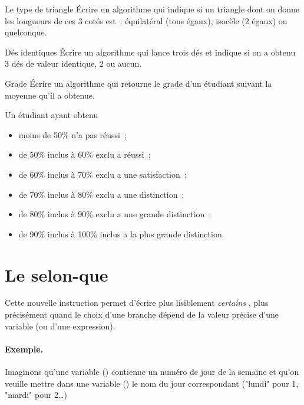 	\begin{Exercice}{Le type de triangle}
		Écrire un algorithme qui indique si un triangle
		dont on donne les longueurs de ces 3 cotés est~:
		équilatéral (tous égaux), isocèle (2 égaux)
		ou quelconque.
	\end{Exercice}

	\begin{Exercice}{Dés identiques}
		Écrire un algorithme qui lance trois dés
		et indique si on a obtenu 3 dés de valeur identique,
		2 ou aucun.
	\end{Exercice}

	\begin{Exercice}{Grade}
		Écrire un algorithme qui retourne le grade d’un étudiant 
		suivant la moyenne qu’il a obtenue.
		
		Un étudiant ayant obtenu 
		\begin{itemize}
			\item moins de 50\% n’a pas réussi~;
			\item de 50\% inclus à 60\% exclu a réussi~;
			\item de 60\% inclus à 70\% exclu a une satisfaction~;
			\item de 70\% inclus à 80\% exclu a une distinction~;
			\item de 80\% inclus à 90\% exclu a une grande distinction~;
			\item de 90\% inclus à 100\% inclus a la plus grande distinction.
		\end{itemize}
	\end{Exercice}

\section{Le selon-que}

	Cette nouvelle instruction permet d’écrire plus lisiblement
	\emph{certains} ,
	plus précisément quand le choix d’une branche dépend
	de la valeur précise d’une variable
	(ou d’une expression).

	\paragraph{Exemple.}
	Imaginons qu’une variable () 
	contienne un numéro de jour de la semaine
	et qu’on veuille mettre dans une variable ()
	le nom du jour correspondant 
	("lundi" pour 1, "mardi" pour 2\dots)
	
